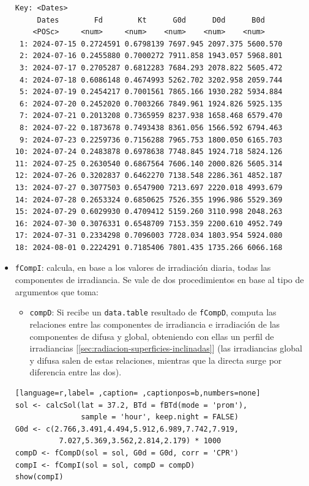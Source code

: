 \begin{itemize}
\begin{verbatim}
Key: <Dates>
	 Dates        Fd        Kt      G0d      D0d      B0d
	<POSc>     <num>     <num>    <num>    <num>    <num>
 1: 2024-07-15 0.2724591 0.6798139 7697.945 2097.375 5600.570
 2: 2024-07-16 0.2455880 0.7000272 7911.858 1943.057 5968.801
 3: 2024-07-17 0.2705287 0.6812283 7684.293 2078.822 5605.472
 4: 2024-07-18 0.6086148 0.4674993 5262.702 3202.958 2059.744
 5: 2024-07-19 0.2454217 0.7001561 7865.166 1930.282 5934.884
 6: 2024-07-20 0.2452020 0.7003266 7849.961 1924.826 5925.135
 7: 2024-07-21 0.2013208 0.7365959 8237.938 1658.468 6579.470
 8: 2024-07-22 0.1873678 0.7493438 8361.056 1566.592 6794.463
 9: 2024-07-23 0.2259736 0.7156288 7965.753 1800.050 6165.703
10: 2024-07-24 0.2483878 0.6978638 7748.845 1924.718 5824.126
11: 2024-07-25 0.2630540 0.6867564 7606.140 2000.826 5605.314
12: 2024-07-26 0.3202837 0.6462270 7138.548 2286.361 4852.187
13: 2024-07-27 0.3077503 0.6547900 7213.697 2220.018 4993.679
14: 2024-07-28 0.2653324 0.6850625 7526.355 1996.986 5529.369
15: 2024-07-29 0.6029930 0.4709412 5159.260 3110.998 2048.263
16: 2024-07-30 0.3076331 0.6548709 7153.359 2200.610 4952.749
17: 2024-07-31 0.2334298 0.7096003 7728.034 1803.954 5924.080
18: 2024-08-01 0.2224291 0.7185406 7801.435 1735.266 6066.168
\end{verbatim}

\item \texttt{fCompI}: calcula, en base a los valores de irradiación diaria, todas las componentes de irradiancia. Se vale de dos procedimientos en base al tipo de argumentos que toma:
\begin{itemize}
\item \texttt{compD}: Si recibe un \texttt{data.table} resultado de \texttt{fCompD}, computa las relaciones entre las componentes de irradiancia e irradiación de las componentes de difusa y global, obteniendo con ellas un perfil de irradiancias [\ref{sec:radiacion-superficies-inclinadas}] (las irradiancias global y difusa salen de estas relaciones, mientras que la directa surge por diferencia entre las dos).
\end{itemize}
\begin{lstlisting}[language=r,label= ,caption= ,captionpos=b,numbers=none]
sol <- calcSol(lat = 37.2, BTd = fBTd(mode = 'prom'),
               sample = 'hour', keep.night = FALSE)
G0d <- c(2.766,3.491,4.494,5.912,6.989,7.742,7.919,
          7.027,5.369,3.562,2.814,2.179) * 1000
compD <- fCompD(sol = sol, G0d = G0d, corr = 'CPR')
compI <- fCompI(sol = sol, compD = compD)
show(compI)
\end{lstlisting}


\end{itemize}
